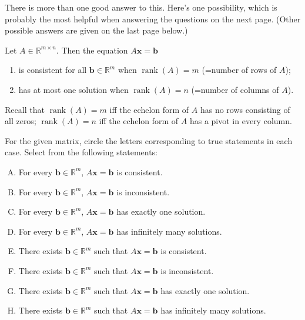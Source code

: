 \documentclass[addpoints,12pt]{exam}
\theoremstyle{remark}
\renewcommand{\vec}[1]{\mathbf{#1}}
\newcommand\rank{\ensuremath{\operatorname{rank}}}
\newcommand{\<}{\ensuremath{\langle}}
\renewcommand{\>}{\ensuremath{\rangle}}
\newcommand{\R}{\ensuremath{\mathbb{R}}}
\newcommand\vb{\vec{b}}
\newcommand\vx{\vec{x}}
\begin{document}
\begin{questions}
\begin{solution}
There is more than one good answer to this.  Here's one possibility, which is probably the most
helpful when answering the questions on the next page.  
(Other possible answers are given on the last page below.)

Let $A\in \R^{m\times n}$. Then the equation $A\vx = \vb$ 
\begin{enumerate}
\item is consistent for all $\vb \in \R^m$ when $\rank(A)=m$ (=number of rows of $A$);
\item has at most one solution when $\rank(A)=n$ (=number of columns of $A$).
\end{enumerate}
Recall that $\rank(A)=m$ iff the echelon form of $A$ has 
no rows consisting of all zeros; 
$\rank(A)=n$ iff the echelon form of $A$ has 
a pivot in every column.

\end{solution}


\newpage


\question For the given matrix, circle the letters corresponding to true statements in each case.
Select from the following statements:
\begin{enumerate}[A.]
        \item For every $\vb \in \R^m$, $A\vx = \vb$ is consistent.
        \item For every $\vb \in \R^m$, $A\vx = \vb$ is inconsistent.
        \item For every $\vb \in \R^m$, $A\vx = \vb$ has exactly one solution.
        \item For every $\vb \in \R^m$, $A\vx = \vb$ has infinitely many solutions.
        \item There exists $\vb \in \R^m$ such that $A\vx = \vb$ is consistent.
        \item There exists $\vb \in \R^m$ such that $A\vx = \vb$ is inconsistent.
        \item There exists $\vb \in \R^m$ such that $A\vx = \vb$ has exactly one solution.
        \item There exists $\vb \in \R^m$ such that $A\vx = \vb$ has infinitely many solutions.
\end{enumerate}
\begin{parts}

\end{parts}
\end{questions}
\end{document}
